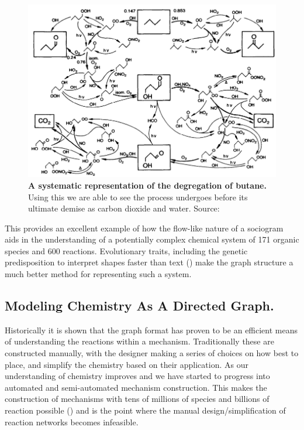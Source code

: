 \begin{figure}[h]
    \centering
        \includegraphics[width=\textwidth]{figures_c1/butane.png}

       \caption{\textbf{A systematic representation of the degregation of butane.} Using this we are able to see the process  undergoes before its ultimate demise as carbon dioxide and water. Source: \citep{butane} }
       \label{fig:butane}
\end{figure}


This provides an excellent example of how the flow-like nature of a sociogram aids in the understanding of a potentially complex chemical system of 171 organic species and 600 reactions. Evolutionary traits, including the genetic predisposition to interpret shapes faster than text (\citep{sapiens}) make the graph structure a much better method for representing such a system.





\subsection{Modeling Chemistry As A Directed Graph.}

Historically it is shown that the graph format has proven to be an efficient means of understanding the reactions within a mechanism. Traditionally these are constructed manually, with the designer making a series of choices on how best to place, and simplify the chemistry based on their application. As our understanding of chemistry improves and we have started to progress into automated and semi-automated mechanism construction. This makes the construction of mechanisms with tens of millions of species and billions of reaction possible (\citep{protocol}) and is the point where the manual design/simplification of reaction networks becomes infeasible.

